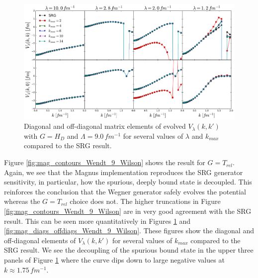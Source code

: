 \documentclass[preprintnumbers,floatfix,aps,prc,preprint]{revtex4-1}
\begin{document}
%
\begin{figure}[H]
  \centering
  \includegraphics[width=15cm]{mag_diags_offdiags_Wendt_9_Wegner}
   \hspace*{0.05\textwidth}%
  \caption{Diagonal and off-diagonal matrix elements of evolved $V_{\lambda}(k,k')$ with $G=H_{D}$ and $\Lambda=9.0 \, fm^{-1}$ for several values of $\lambda$ and $k_{max}$ compared to the SRG result.}
  \label{fig:mag_diags_offdiags_Wendt_9_Wegner}
\end{figure}
%
Figure \ref{fig:mag_contours_Wendt_9_Wilson} shows the result for $G=T_{rel}$. Again, we see that the Magnus implementation reproduces the SRG generator sensitivity, in particular, how the spurious, deeply bound state is decoupled. This reinforces the conclusion that the Wegner generator safely evolves the potential whereas the $G=T_{rel}$ choice does not. The higher truncations in Figure \ref{fig:mag_contours_Wendt_9_Wilson} are in very good agreement with the SRG result. This can be seen more quantitatively in Figures \ref{fig:mag_diags_offdiags_Wendt_9_Wegner} and \ref{fig:mag_diags_offdiags_Wendt_9_Wilson}. These figures show the diagonal and off-diagonal elements of $V_{\lambda}(k,k')$ for several values of $k_{max}$ compared to the SRG result. We see the decoupling of the spurious bound state in the upper three panels of Figure \ref{fig:mag_diags_offdiags_Wendt_9_Wegner} where the curve dips down to large negative values at $k \approx 1.75 \, fm^{-1}$.
%
\end{document}
